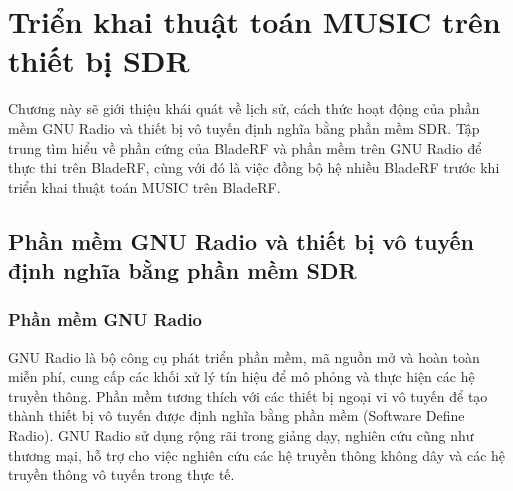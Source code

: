 \setcounter{chapter}{1}
\chapter[\MakeUppercase{Triển khai thuật toán MUSIC trên thiết bị SDR}]{Triển khai thuật toán MUSIC trên thiết bị SDR}


Chương này sẽ giới thiệu khái quát về lịch sử, cách thức hoạt động của phần mềm GNU Radio và thiết bị vô tuyến định nghĩa bằng phần mềm SDR. Tập trung tìm hiểu về phần cứng của BladeRF và phần mềm trên GNU Radio để thực thi trên BladeRF, cùng với đó là việc đồng bộ hệ nhiều BladeRF trước khi triển khai thuật toán MUSIC trên BladeRF.

\section{Phần mềm GNU Radio và thiết bị vô tuyến định nghĩa bằng phần mềm SDR}

\subsection{Phần mềm GNU Radio}

GNU Radio là bộ công cụ phát triển phần mềm, mã nguồn mở và hoàn toàn miễn phí, cung cấp các khối xử lý tín hiệu để mô phỏng và thực hiện các hệ truyền thông. Phần mềm tương thích với các thiết bị ngoại vi vô tuyến để tạo thành thiết bị vô tuyến được định nghĩa bằng phần mềm (Software Define Radio). GNU Radio sử dụng rộng rãi trong giảng dạy, nghiên cứu cũng như thương mại, hỗ trợ cho việc nghiên cứu các hệ truyền thông không dây và các hệ truyền thông vô tuyến trong thực tế.

